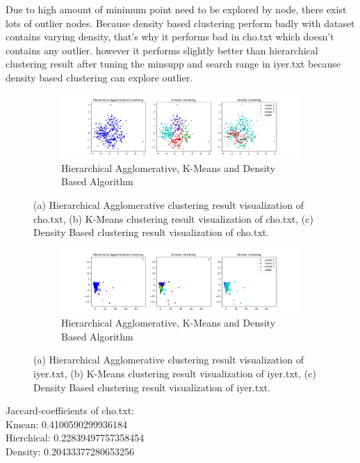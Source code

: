 \documentclass[fleqn]{llncs}
\begin{document}
Due to high amount of minimum point need to be explored by node, there exist lots of outlier nodes. Because density based clustering perform badly with dataset contains varying density, that's why it performs bad in cho.txt which doesn't contains any outlier. however it performs slightly better than hierarchical clustering result after tuning the minsupp and search range in iyer.txt because density based clustering can explore outlier.

\begin{figure}
	\centering
	\begin{subfigure}{1\textwidth}
		\centering\includegraphics[width=1\textwidth]{all_three.jpg}
		\caption{Hierarchical Agglomerative, K-Means and Density Based Algorithm}
	\end{subfigure}
	\caption{(a) Hierarchical Agglomerative clustering result visualization of cho.txt, (b) K-Means clustering result visualization of cho.txt, (c) Density Based clustering result visualization of cho.txt.}
	\label{fig2}
\end{figure}
\begin{figure}
	\centering
	\begin{subfigure}{1\textwidth}
		\centering\includegraphics[width=1\textwidth]{all_threeiyer.jpg}
		\caption{Hierarchical Agglomerative, K-Means and Density Based Algorithm}
	\end{subfigure}
	\caption{(a) Hierarchical Agglomerative clustering result visualization of iyer.txt, (b) K-Means clustering result visualization of iyer.txt, (c) Density Based clustering result visualization of iyer.txt.}
	\label{fig3}
\end{figure}
Jaccard-coefficients of cho.txt:\\
Kmean: 0.4100590299936184\\ 
Hierchical: 0.22839497757358454\\
Density: 0.20433377280653256\\
\end{document}
